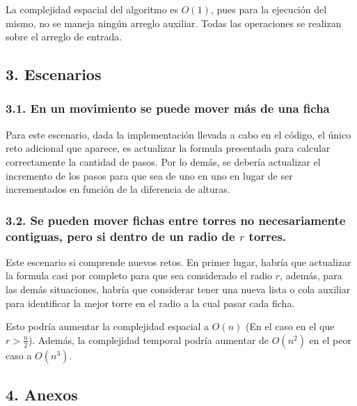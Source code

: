 \documentclass[
]{article}
\begin{document}
La complejidad espacial del algoritmo es \(O(1)\), pues para la
ejecución del mismo, no se maneja ningún arreglo auxiliar. Todas las
operaciones se realizan sobre el arreglo de entrada.

\hypertarget{escenarios}{%
\subsection{3. Escenarios}\label{escenarios}}

\hypertarget{en-un-movimiento-se-puede-mover-muxe1s-de-una-ficha}{%
\subsubsection{3.1. En un movimiento se puede mover más de una
ficha}\label{en-un-movimiento-se-puede-mover-muxe1s-de-una-ficha}}

Para este escenario, dada la implementación llevada a cabo en el código,
el único reto adicional que aparece, es actualizar la formula presentada
para calcular correctamente la cantidad de pasos. Por lo demás, se
debería actualizar el incremento de los pasos para que sea de uno en uno
en lugar de ser incrementados en función de la diferencia de alturas.

\hypertarget{se-pueden-mover-fichas-entre-torres-no-necesariamente-contiguas-pero-si-dentro-de-un-radio-de-r-torres.}{%
\subsubsection{\texorpdfstring{3.2. Se pueden mover fichas entre torres
no necesariamente contiguas, pero si dentro de un radio de \(r\)
torres.}{3.2. Se pueden mover fichas entre torres no necesariamente contiguas, pero si dentro de un radio de r torres.}}\label{se-pueden-mover-fichas-entre-torres-no-necesariamente-contiguas-pero-si-dentro-de-un-radio-de-r-torres.}}

Este escenario si comprende nuevos retos. En primer lugar, habría que
actualizar la formula casi por completo para que sea considerado el
radio \(r\), además, para las demás situaciones, habría que considerar
tener una nueva lista o cola auxiliar para identificar la mejor torre en
el radio a la cual pasar cada ficha.

Esto podría aumentar la complejidad espacial a \(O(n)\) (En el caso en
el que \(r > \frac{n}{2}\)). Además, la complejidad temporal podría
aumentar de \(O(n^2)\) en el peor caso a \(O(n^3)\).

\hypertarget{anexos}{%
\subsection{4. Anexos}\label{anexos}}
\end{document}
